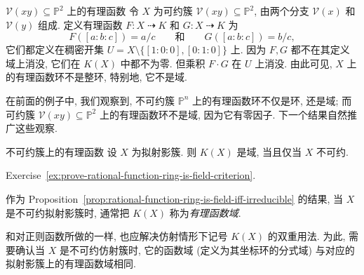 \begin{Example}{$\mathcal{V}(xy)\subseteq\mathbb{P}^{2}$ 上的有理函数}\leavevmode\label{ex:rational-functions-on-union-of-projective-lines}
令 $X$ 为可约簇 $\mathcal{V}(xy)\subseteq\mathbb{P}^{2}$, 由两个分支 $\mathcal{V}(x)$ 和 $\mathcal{V}(y)$ 组成. 定义有理函数 $F:X\mathrel{\rightdasharrow} K$ 和 $G:X\mathrel{\rightdasharrow} K$ 为
\[
  F([a:b:c])=a/c\qquad\text{和}\qquad G([a:b:c])=b/c,
\]
它们都定义在稠密开集 $U=X\setminus\{[1:0:0],[0:1:0]\}$ 上. 因为 $F,G$ 都不在其定义域上消没, 它们在 $K(X)$ 中都不为零. 但乘积 $F\cdot G$ 在 $U$ 上消没. 由此可见, $X$ 上的有理函数环不是整环, 特别地, 它不是域.
\end{Example}

在前面的例子中, 我们观察到, 不可约簇 $\mathbb{P}^{n}$ 上的有理函数环不仅是环, 还是域; 而可约簇 $\mathcal{V}(xy)\subseteq\mathbb{P}^{2}$ 上的有理函数环不是域, 因为它有零因子. 下一个结果自然推广这些观察.

\begin{Proposition}{不可约簇上的有理函数}\leavevmode\label{prop:rational-function-ring-is-field-iff-irreducible}
设 $X$ 为拟射影簇. 则 $K(X)$ 是域, 当且仅当 $X$ 不可约.
\end{Proposition}
\begin{Proof}
Exercise~\ref{ex:prove-rational-function-ring-is-field-criterion}.
\end{Proof}

作为 Proposition~\ref{prop:rational-function-ring-is-field-iff-irreducible} 的结果, 当 $X$ 是不可约拟射影簇时, 通常把 $K(X)$ 称为\emph{有理函数域}.

和对正则函数所做的一样, 也应解决仿射情形下记号 $K(X)$ 的双重用法. 为此, 需要确认当 $X$ 是不可约仿射簇时, 它的函数域 (定义为其坐标环的分式域) 与对应的拟射影簇上的有理函数域相同.

